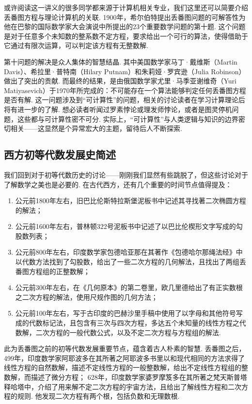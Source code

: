 或许阅读这一讲义的很多同学都来源于计算机相关专业，我们这里还可以简要介绍丢番图方程与理论计算机的关联. 1900年，希尔伯特提出丢番图问题的可解答性为他在巴黎的国际数学家大会演说中所提出的23个重要数学问题的第十题. 这个问题是对于任意多个未知数的整系数不定方程，要求给出一个可行的算法，使得借助于它通过有限次运算，可以判定该方程有无整数解.

第十问题的解决是众人集体的智慧结晶. 其中美国数学家马丁·戴维斯（Martin Davis）、希拉里·普特南（Hilary Putnam）和朱莉娅·罗宾逊（Julia Robinson）做出了突出的贡献. 而最终的结果，是由俄国数学家尤里·马季亚谢维奇（Yuri Matiyasevich）于1970年所完成的：不可能存在一个算法能够判定任何丢番图方程是否有解. 这一问题涉及到``可计算性''的问题，相关的讨论读者在学习计算理论后将有进一步的了解. 想必读者听闻过罗素悖论或理发师悖论，或者是图灵停机问题，这些都与可计算性密不可分. 实际上，``可计算性''与人类逻辑与知识的边界密切相关——这显然是个异常宏大的主题，留待后人不断探索.

\subsection{西方初等代数发展史简述}

我们回到对于初等代数历史的讨论——刚刚我们显然有些跳脱了，但这些讨论对于了解数学之美也是必要的. 在古代西方，还有几个重要的时间节点值得提及：
\begin{enumerate}
    \item 公元前1800年左右，旧巴比伦斯特拉斯堡泥板书中记述其寻找著二次椭圆方程的解法；

    \item 公元前1600年左右，普林顿322号泥板书中记述了以巴比伦楔形文字写成的勾股数列表；

    \item 公元前800年左右，印度数学家包德哈亚那在其著作《包德哈尔那绳法经》中以代数方法找到了勾股数，给出了一些二次方程的几何解法，且找出了两组丢番图方程组的正整数解；

    \item 公元前300年左右，在《几何原本》的第二卷里，欧几里德给出了有正实数根之二次方程的解法，使用尺规作图的几何方法；

    \item 公元前100年左右，写于古印度的巴赫沙里手稿中使用了以字母和其他符号写成的代数标记法，且包含有三次与四次方程，多达五个未知量的线性方程之代数解，二次方程的一般代数公式，以及不定二次方程与方程组的解法.
\end{enumerate}

此为丢番图之前的初等代数发展重要节点，蕴含着古人朴素的智慧. 丢番图之后，499年，印度数学家阿耶波多在其所著之阿耶波多书里以和现代相同的方法求得了线性方程的自然数解，描述不定线性方程的一般整数解，给出不定线性方程组的整数解，而描述了微分方程；
628年，印度数学家婆罗摩笈多在其所著之梵天斯普塔释哈塔中，介绍了用来解不定二次方程的宇宙方法，且给出了解线性方程和二次方程的规则. 他发现二次方程有两个根，包括负数和无理数根.

